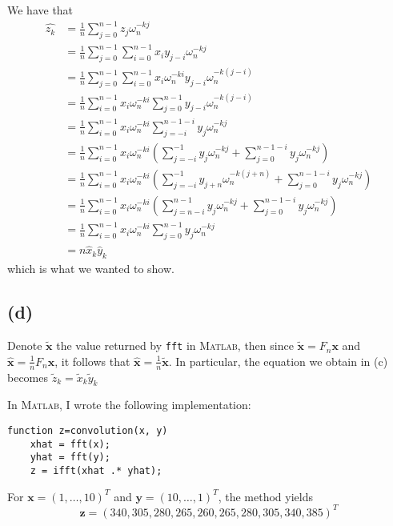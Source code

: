 \documentclass{article}
\renewcommand{\vec}{\mathbf}
\begin{document}
We have that
\begin{align*}
	\hat{z_k} &= \frac{1}{n}\sum_{j=0}^{n-1}z_j\omega_n^{-kj}\\
	&= \frac{1}{n}\sum_{j=0}^{n-1}\sum_{i=0}^{n-1}
	x_i y_{j-i}\omega_n^{-kj}\\
	&= \frac{1}{n}\sum_{j=0}^{n-1}\sum_{i=0}^{n-1}
	x_i\omega_n^{-ki} y_{j-i}\omega_n^{-k(j - i)}\\
	&= \frac{1}{n}\sum_{i=0}^{n-1}x_i\omega_n^{-ki}
	\sum_{j=0}^{n-1}
	 y_{j-i}\omega_n^{-k(j - i)}\\
	&= \frac{1}{n}\sum_{i=0}^{n-1}x_i\omega_n^{-ki}
	\sum_{j=-i}^{n-1-i}
	 y_j\omega_n^{-kj}\\
	&= \frac{1}{n}\sum_{i=0}^{n-1}x_i\omega_n^{-ki}
	\left(\sum_{j=-i}^{-1} y_j\omega_n^{-kj} + 
	\sum_{j=0}^{n-1-i} y_j\omega_n^{-kj}\right)\\
	&= \frac{1}{n}\sum_{i=0}^{n-1}x_i\omega_n^{-ki}
	\left(\sum_{j=-i}^{-1} y_{j + n}\omega_n^{-k(j + n)} + 
	\sum_{j=0}^{n-1-i} y_j\omega_n^{-kj}\right)\\
	&= \frac{1}{n}\sum_{i=0}^{n-1}x_i\omega_n^{-ki}
	\left(\sum_{j=n-i}^{n-1} y_j\omega_n^{-kj} + 
	\sum_{j=0}^{n-1-i} y_j\omega_n^{-kj}\right)\\
	&= \frac{1}{n}\sum_{i=0}^{n-1}x_i\omega_n^{-ki}
	\sum_{j=0}^{n-1} y_j\omega_n^{-kj}\\
	&= n\hat{x}_k\hat{y}_k
\end{align*}
which is what we wanted to show.

\subsection*{(d)}

Denote $\tilde{\vec{x}}$ the value returned by \texttt{fft}
in \textsc{Matlab}, then since $\tilde{\vec{x}} = F_n\vec{x}$
and $\hat{\vec{x}} = \frac{1}{n}F_n\vec{x}$, it follows that
$\hat{\vec{x}} = \frac{1}{n}\tilde{\vec{x}}$.
In particular, the equation we obtain in (c) becomes
$\tilde{z}_k = \tilde{x}_k\tilde{y}_k$

In \textsc{Matlab}, I wrote the following implementation:
\begin{Verbatim}[frame=single,
	label=\textsc{Matlab} code - convolution.m]
function z=convolution(x, y)
	xhat = fft(x);
	yhat = fft(y);
	z = ifft(xhat .* yhat);
\end{Verbatim}
For $\vec{x} = (1, \dots, 10)^T$ and
$\vec{y} = (10, \dots, 1)^T$,
the method yields
\begin{equation*}
	\vec{z} = (340, 305, 280, 265, 260, 265, 280, 305, 340, 385)^T
\end{equation*}
\end{document}

